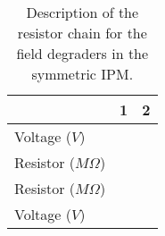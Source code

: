 \begin{table}[ht]
	\centering
	\caption[Description of the resistor chain for the field degraders in the asymmetric IPM]
	{Description of the resistor chain for the field degraders in the symmetric IPM.}
	\label{}
	\begin{tabular}{llr}
		\toprule
		                       & 1 & 2 \\
		\midrule
		Voltage (\(V\))        &   &   \\
		Resistor (\(M\Omega\)) &   &   \\
		Resistor (\(M\Omega\)) &   &   \\
		Voltage (\(V\))        &   &   \\
		\bottomrule
	\end{tabular}
\end{table}